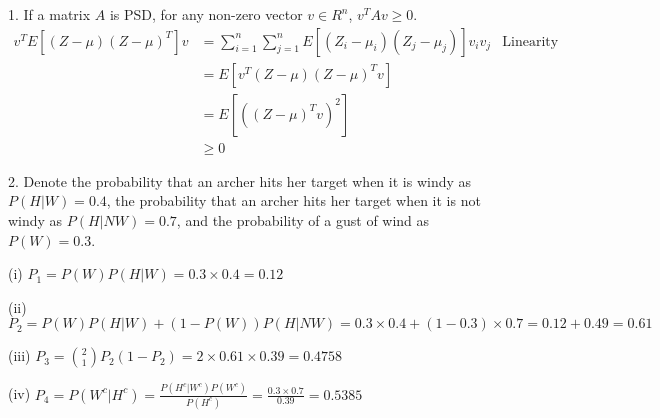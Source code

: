 \documentclass[11pt]{article}
\begin{document}
\setcounter{page}{2}
\begin{solution}

\item 1.  If a matrix $A$ is PSD,  for any non-zero vector $v \in R^n$,  $v^TAv \geq 0$.
\begin{align*}
	v^TE[(Z-\mu)(Z-\mu)^T]v
	& = \sum^n_{i=1} \sum^n_{j=1}E[(Z_i-\mu_i)(Z_j-\mu_j)]v_iv_j  & \text{Linearity of expectation} \\
	& = E[v^T(Z-\mu)(Z-\mu)^Tv] \\
	& = E[((Z-\mu)^Tv)^2] \\
	& \geq 0
\end{align*}

\item 2.  Denote the probability that an archer hits her target when it is windy as $P(H|W) = 0.4$, the probability that an archer hits her target when it is not windy as $P(H|NW) = 0.7$,  and the probability of a gust of wind as $P(W) = 0.3$.
\item (i) $P_1 = P(W)P(H|W) = 0.3 \times 0.4 = 0.12$
\item (ii) $P_2 = P(W)P(H|W) + (1-P(W))P(H|NW) = 0.3 \times 0.4 + (1-0.3) \times 0.7 = 0.12 + 0.49 = 0.61$
\item (iii) $P_3 = {2 \choose 1} P_2 (1-P_2) = 2 \times 0.61 \times 0.39 = 0.4758$
\item (iv) $P_4 = P(W^c|H^c) = \frac{P(H^c|W^c)P(W^c)}{P(H^c)} = \frac{0.3 \times 0.7}{0.39} = 0.5385$


\end{solution}
\end{document}
